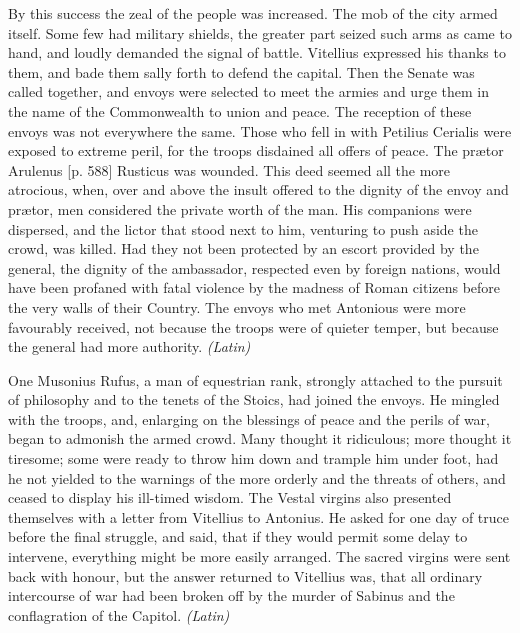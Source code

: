 
By this success the zeal of the people was increased. The mob of the city armed itself. Some few had military shields, the greater part seized such arms as came to hand, and loudly demanded the signal of battle. Vitellius expressed his thanks to them, and bade them sally forth to defend the capital. Then the Senate was called together, and envoys were selected to meet the armies and urge them in the name of the Commonwealth to union and peace. The reception of these envoys was not everywhere the same. Those who fell in with Petilius Cerialis were exposed to extreme peril, for the troops disdained all offers of peace. The prætor Arulenus [p. 588] Rusticus was wounded. This deed seemed all the more atrocious, when, over and above the insult offered to the dignity of the envoy and prætor, men considered the private worth of the man. His companions were dispersed, and the lictor that stood next to him, venturing to push aside the crowd, was killed. Had they not been protected by an escort provided by the general, the dignity of the ambassador, respected even by foreign nations, would have been profaned with fatal violence by the madness of Roman citizens before the very walls of their Country. The envoys who met Antonious were more favourably received, not because the troops were of quieter temper, but because the general had more authority. \emph{(Latin)}


One Musonius Rufus, a man of equestrian rank, strongly attached to the pursuit of philosophy and to the tenets of the Stoics, had joined the envoys. He mingled with the troops, and, enlarging on the blessings of peace and the perils of war, began to admonish the armed crowd. Many thought it ridiculous; more thought it tiresome; some were ready to throw him down and trample him under foot, had he not yielded to the warnings of the more orderly and the threats of others, and ceased to display his ill-timed wisdom. The Vestal virgins also presented themselves with a letter from Vitellius to Antonius. He asked for one day of truce before the final struggle, and said, that if they would permit some delay to intervene, everything might be more easily arranged. The sacred virgins were sent back with honour, but the answer returned to Vitellius was, that all ordinary intercourse of war had been broken off by the murder of Sabinus and the conflagration of the Capitol. \emph{(Latin)}


